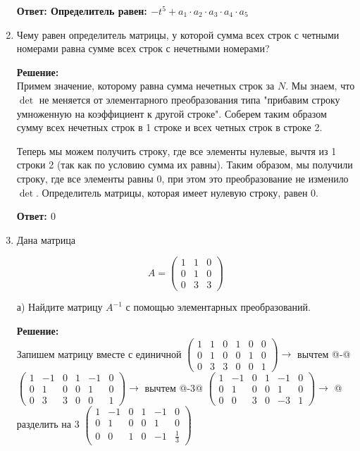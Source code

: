 \documentclass[a4paper,12pt]{article}
\makeatletter
\newcommand*{\rom}[1]{\expandafter\@slowromancap\romannumeral #1@}
\makeatother
\begin{document}
\begin{enumerate}
\textbf{Ответ: Определитель равен: $-t^5+a_1 \cdot a_2 \cdot a_3 \cdot a_4 \cdot a_5$}


\item Чему равен определитель матрицы, у которой сумма всех строк с четными номерами равна сумме всех строк с
нечетными номерами?

\vspace{5pt}

\textbf{Решение:}\\
Примем значение, которому равна сумма нечетных строк за $N$. Мы знаем, что $\det$ не меняется от элементарного преобразования типа "прибавим строку умноженную на коэффициент к другой строке". Соберем таким образом сумму всех нечетных строк в 1 строке и всех четных строк в строке 2.

Теперь мы можем получить строку, где все элементы нулевые, вычтя из 1 строки 2 (так как по условию сумма их равны). Таким образом, мы получили строку, где все элементы равны 0, при этом это преобразование не изменило $\det$. Определитель матрицы, которая имеет нулевую строку, равен 0.

\textbf{Ответ:  $0$}


\item Дана матрица 

$$
A=\begin{pmatrix}
1&1&0\\
0&1&0\\
0&3&3
\end{pmatrix}
$$


а) Найдите матрицу $A^{-1}$ с помощью элементарных преобразований.

\textbf{Решение:}\\
Запишем матрицу вместе с единичной
$
\left(\begin{array}{ccc|ccc}  
 1&1&0&1&0&0\\
0&1&0&0&1&0\\
0&3&3&0&0&1
\end{array}\right) \rightarrow$ вычтем \rom{1}-\rom{2} \\
$
\left(\begin{array}{ccc|ccc}  
 1&-1&0&1&-1&0\\
0&1&0&0&1&0\\
0&3&3&0&0&1
\end{array}\right) \rightarrow$ вычтем \rom{3}-3\rom{2} $
\left(\begin{array}{ccc|ccc}  
1&-1&0&1&-1&0\\
0&1&0&0&1&0\\
0&0&3&0&-3&1
\end{array}\right) \rightarrow$ \rom{3} разделить на 3 $
\left(\begin{array}{ccc|ccc}  
1&-1&0&1&-1&0\\
0&1&0&0&1&0\\
0&0&1&0&-1&\frac{1}{3}
\end{array}\right)$


\end{enumerate}
\end{document}
